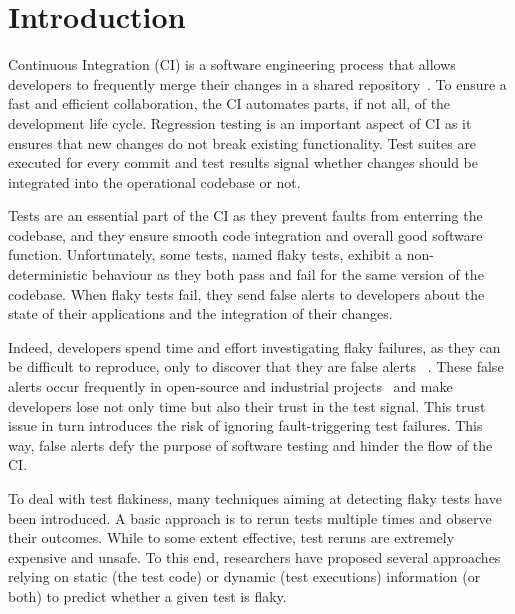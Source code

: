 \section{Introduction}
\label{sec:chromium-introduction}


Continuous Integration (CI) is a software engineering process that allows developers to frequently merge their changes in a shared repository~\cite{CI}. To ensure a fast and efficient collaboration, the CI automates parts, if not all, of the development life cycle. Regression testing is an important aspect of CI as it ensures that new changes do not break existing functionality. Test suites are executed for every commit and test results signal whether changes should be integrated into the operational codebase or not.

Tests are an essential part of the CI as they prevent faults from enterring the codebase, and they ensure smooth code integration and overall good software function. Unfortunately, some tests, named flaky tests, exhibit a non-deterministic behaviour as they both pass and fail for the same version of the codebase. When flaky tests fail, they send false alerts to developers about the state of their applications and the integration of their changes. 

Indeed, developers spend time and effort investigating flaky failures, as they can be difficult to reproduce, only to discover that they are false alerts ~\cite{Eck2019}. These false alerts occur frequently in open-source and industrial projects~\cite{Bell2018,Kowalczyk2020,Lam2019iDFlakies,LeongSPTM19} and make developers lose not only time but also their trust in the test signal. This trust issue in turn introduces the risk of ignoring fault-triggering test failures. This way, false alerts defy the purpose of software testing and hinder the flow of the CI.

To deal with test flakiness, many techniques aiming at detecting flaky tests have been introduced. A basic approach is to rerun tests multiple times and observe their outcomes. While to some extent effective, test reruns are extremely expensive \cite{LeongSPTM19,Bell2018} and unsafe. To this end, researchers have proposed several approaches relying on static (the test code) \cite{camara2021use,Pinto2020,fatima2021flakify,King2018, LeongSPTM19} or dynamic (test executions) \cite{Bell2018,Lam2019iDFlakies,ziftci2020flake} information (or both) \cite{FlakeFlagger} to predict whether a given test is flaky. 

